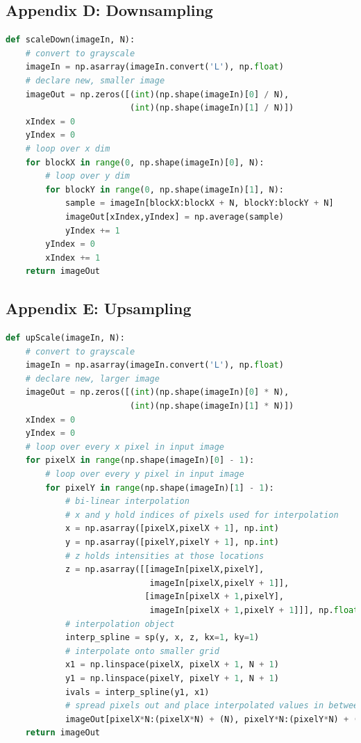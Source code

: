 \documentclass[11pt,a4paper]{article}
\begin{document}
\subsection{Appendix D: Downsampling} \label{app:downsample}
	\begin{lstlisting}[language=Python]
def scaleDown(imageIn, N):
    # convert to grayscale
    imageIn = np.asarray(imageIn.convert('L'), np.float)
    # declare new, smaller image
    imageOut = np.zeros([(int)(np.shape(imageIn)[0] / N), 
                         (int)(np.shape(imageIn)[1] / N)])
    xIndex = 0
    yIndex = 0
    # loop over x dim
    for blockX in range(0, np.shape(imageIn)[0], N):
        # loop over y dim
        for blockY in range(0, np.shape(imageIn)[1], N):
            sample = imageIn[blockX:blockX + N, blockY:blockY + N]
            imageOut[xIndex,yIndex] = np.average(sample)
            yIndex += 1
        yIndex = 0
        xIndex += 1
    return imageOut
    \end{lstlisting}
    
\pagebreak
    
\subsection{Appendix E: Upsampling}
	\begin{lstlisting}[language=Python]
def upScale(imageIn, N):
    # convert to grayscale
    imageIn = np.asarray(imageIn.convert('L'), np.float)
    # declare new, larger image
    imageOut = np.zeros([(int)(np.shape(imageIn)[0] * N), 
                         (int)(np.shape(imageIn)[1] * N)])
    xIndex = 0
    yIndex = 0
    # loop over every x pixel in input image
    for pixelX in range(np.shape(imageIn)[0] - 1):
        # loop over every y pixel in input image
        for pixelY in range(np.shape(imageIn)[1] - 1):
            # bi-linear interpolation
            # x and y hold indices of pixels used for interpolation
            x = np.asarray([pixelX,pixelX + 1], np.int)
            y = np.asarray([pixelY,pixelY + 1], np.int)
            # z holds intensities at those locations
            z = np.asarray([[imageIn[pixelX,pixelY],
                             imageIn[pixelX,pixelY + 1]],
                            [imageIn[pixelX + 1,pixelY],
                             imageIn[pixelX + 1,pixelY + 1]]], np.float)
            # interpolation object
            interp_spline = sp(y, x, z, kx=1, ky=1)
            # interpolate onto smaller grid
            x1 = np.linspace(pixelX, pixelX + 1, N + 1)
            y1 = np.linspace(pixelY, pixelY + 1, N + 1)
            ivals = interp_spline(y1, x1)
            # spread pixels out and place interpolated values in between
            imageOut[pixelX*N:(pixelX*N) + (N), pixelY*N:(pixelY*N) + (N)] = ivals[0:N,0:N]
    return imageOut
    \end{lstlisting}
    
\end{document}
